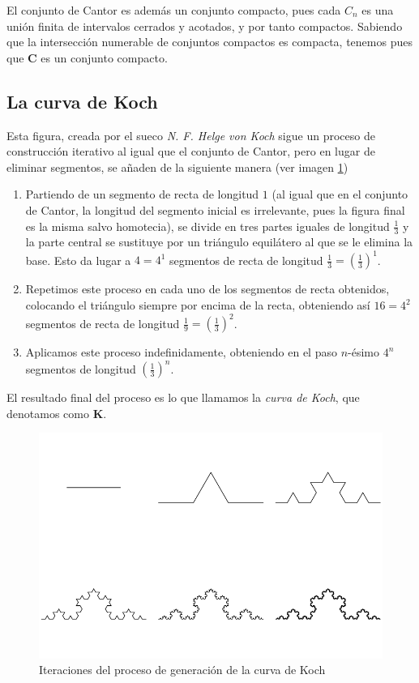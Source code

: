 El conjunto de Cantor es además un conjunto compacto, pues cada $C_n$ es una unión finita de intervalos cerrados y acotados, y por tanto compactos. Sabiendo que la intersección numerable de conjuntos compactos es compacta, tenemos pues que $\mathbf{C}$ es un conjunto compacto.

\subsection{La curva de Koch}
\label{subsection:curva-Koch}

Esta figura, creada por el sueco \textit{N. F. Helge von Koch} sigue un proceso de construcción iterativo al igual que el conjunto de Cantor, pero en lugar de eliminar segmentos, se añaden de la siguiente manera (ver imagen \ref{fig:curva-Koch})

\begin{enumerate}
\item Partiendo de un segmento de recta de longitud $1$ (al igual que en el conjunto de Cantor, la longitud del segmento inicial es irrelevante, pues la figura final es la misma salvo homotecia), se divide en tres partes iguales de longitud $\frac 1 3$ y la parte central se sustituye por un triángulo equilátero al que se le elimina la base. Esto da lugar a $4=4^1$ segmentos de recta de longitud $\frac 1 3=\left(\frac 1 3\right)^1$.

\item Repetimos este proceso en cada uno de los segmentos de recta obtenidos, colocando el triángulo siempre por encima de la recta, obteniendo así $16=4^2$ segmentos de recta de longitud $\frac 1 9=\left(\frac 1 3\right)^2$.

\item Aplicamos este proceso indefinidamente, obteniendo en el paso $n$-ésimo $4^n$ segmentos de longitud $\left(\frac 1 3\right)^n$. 
\end{enumerate}

El resultado final del proceso es lo que llamamos la \textit{curva de Koch}, que denotamos como \textbf{K}.

\begin{figure} [h]
\centering
\includegraphics[scale = 0.6]{img/curva-Koch.png}
\caption{Iteraciones del proceso de generación de la curva de Koch}
 \label{fig:curva-Koch}
\end{figure}

